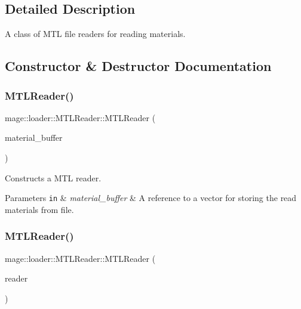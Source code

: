 \subsection{Detailed Description}
A class of M\+TL file readers for reading materials. 

\subsection{Constructor \& Destructor Documentation}
\hypertarget{classmage_1_1loader_1_1_m_t_l_reader_a47b08a358e5b84aca18b62369bb7a6fa}{}\label{classmage_1_1loader_1_1_m_t_l_reader_a47b08a358e5b84aca18b62369bb7a6fa} 
\subsubsection{\texorpdfstring{M\+T\+L\+Reader()}{MTLReader()}\hspace{0.1cm}{\footnotesize\ttfamily [1/3]}}
{\footnotesize\ttfamily mage\+::loader\+::\+M\+T\+L\+Reader\+::\+M\+T\+L\+Reader (\begin{DoxyParamCaption}\item[{std\+::vector$<$ \hyperlink{classmage_1_1_material}{Material} $>$ \&}]{material\+\_\+buffer }\end{DoxyParamCaption})\hspace{0.3cm}{\ttfamily [explicit]}}

Constructs a M\+TL reader.


\begin{DoxyParams}[1]{Parameters}
\mbox{\tt in}  & {\em material\+\_\+buffer} & A reference to a vector for storing the read materials from file. \\
\hline
\end{DoxyParams}
\hypertarget{classmage_1_1loader_1_1_m_t_l_reader_a00a161e4100e1d5df1315b4ef92d7e35}{}\label{classmage_1_1loader_1_1_m_t_l_reader_a00a161e4100e1d5df1315b4ef92d7e35} 
\subsubsection{\texorpdfstring{M\+T\+L\+Reader()}{MTLReader()}\hspace{0.1cm}{\footnotesize\ttfamily [2/3]}}
{\footnotesize\ttfamily mage\+::loader\+::\+M\+T\+L\+Reader\+::\+M\+T\+L\+Reader (\begin{DoxyParamCaption}\item[{const \hyperlink{classmage_1_1loader_1_1_m_t_l_reader}{M\+T\+L\+Reader} \&}]{reader }\end{DoxyParamCaption})\hspace{0.3cm}{\ttfamily [delete]}}

